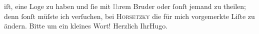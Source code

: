 \begin{ledgroupsized}[t]{13cm}
               iſt, eine Loge zu haben und ſie mit \textcolor{gray}{Ih}rem Bruder oder ſonſt jemand zu theilen; denn
               ſonſt müſste ich verſuchen, bei \textsc{Horsetzky} die für mich  vorgemerkte Liſte zu
               ändern. Bitte um ein kleines Wort!\pend
           \pstart Herzlich Ihr\spacefill\mbox{Hugo.}\pend{}          \endnumbering{}\end{ledgroupsized}  \newcommand{\dateiname}{L02014}\newcommand{\titel}{Hugo von Hofmannsthal an Arthur Schnitzler, 26. [3. 1911]}\newcommand{\editorInnen}{Martin Anton Müller und Gerd-Hermann Susen}
            \footnotesize
\begin{ledgroupsized}[t]{11.5cm}
\end{ledgroupsized}
         
      